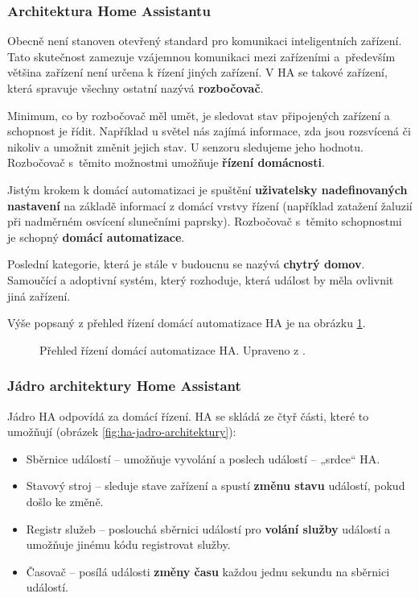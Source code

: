 \subsubsection{Architektura Home Assistantu}
Obecně není stanoven otevřený standard pro komunikaci inteligentních zařízení. Tato skutečnost zamezuje vzájemnou komunikaci mezi zařízeními a~především většina zařízení není určena k řízení jiných zařízení. V HA se takové zařízení, která spravuje všechny ostatní nazývá \textbf{rozbočovač}.

Minimum, co by rozbočovač měl umět, je sledovat stav připojených zařízení a schopnost je řídit. Například u světel nás zajímá informace, zda jsou rozsvícená či nikoliv a umožnit změnit jejich stav. U senzoru sledujeme jeho hodnotu. Rozbočovač s~těmito možnostmi umožňuje \textbf{řízení domácnosti}.

Jistým krokem k domácí automatizaci je spuštění \textbf{uživatelsky nadefinovaných nastavení} na základě informací z domácí vrstvy řízení (například zatažení žaluzií při nadměrném osvícení slunečními paprsky). Rozbočovač s~těmito schopnostmi je schopný \textbf{domácí automatizace}.

Poslední kategorie, která je stále v budoucnu se nazývá \textbf{chytrý domov}. Samoučící a adoptivní systém, který rozhoduje, která událost by měla ovlivnit jiná zařízení.

Výše popsaný z přehled řízení domácí automatizace HA je na obrázku \ref{fig:ha-prehled-domaci-autmatizace}.


\begin{figure}[H]
    \centering
    \def\svgwidth{\columnwidth}
    
    \caption{Přehled řízení domácí automatizace HA. Upraveno z \cite{home-assistant-architektura}.}
    \label{fig:ha-prehled-domaci-autmatizace}
\end{figure}

\subsubsection{Jádro architektury Home Assistant}
Jádro HA odpovídá za domácí řízení. HA se skládá ze čtyř části, které to umožňují (obrázek \ref{fig:ha-jadro-architektury}):

\begin{itemize}
\item Sběrnice událostí – umožňuje vyvolání a poslech událostí – „srdce“ HA.
\item Stavový stroj – sleduje stave zařízení a spustí \textbf{změnu stavu} událostí, pokud došlo ke změně.
\item  Registr služeb – poslouchá sběrnici událostí pro \textbf{volání služby} událostí a umožňuje jinému kódu registrovat služby.
\item Časovač – posílá události \textbf{změny času} každou jednu sekundu na sběrnici událostí.
\end{itemize}

